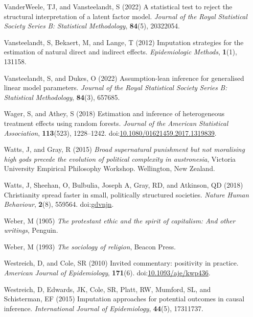 \documentclass[
  singlecolumn,
  9pt]{article}
\begin{document}
\begin{CSLReferences}
VanderWeele, TJ, and Vansteelandt, S (2022) A statistical test to reject
the structural interpretation of a latent factor model. \emph{Journal of
the Royal Statistical Society Series B: Statistical Methodology},
\textbf{84}(5), 20322054.

Vansteelandt, S, Bekaert, M, and Lange, T (2012) Imputation strategies
for the estimation of natural direct and indirect effects.
\emph{Epidemiologic Methods}, \textbf{1}(1), 131158.

Vansteelandt, S, and Dukes, O (2022) Assumption-lean inference for
generalised linear model parameters. \emph{Journal of the Royal
Statistical Society Series B: Statistical Methodology}, \textbf{84}(3),
657685.

Wager, S, and Athey, S (2018) Estimation and inference of heterogeneous
treatment effects using random forests. \emph{Journal of the American
Statistical Association}, \textbf{113}(523), 1228--1242.
doi:\href{https://doi.org/10.1080/01621459.2017.1319839}{10.1080/01621459.2017.1319839}.

Watts, J, and Gray, R (2015) \emph{Broad supernatural punishment but not
moralising high gods precede the evolution of political complexity in
austronesia}, Victoria University Empirical Philosophy Workshop.
Wellington, New Zealand.

Watts, J, Sheehan, O, Bulbulia, Joseph A, Gray, RD, and Atkinson, QD
(2018) Christianity spread faster in small, politically structured
societies. \emph{Nature Human Behaviour}, \textbf{2}(8), 559564.
doi:\href{https://doi.org/gdvnjn}{gdvnjn}.

Weber, M (1905) \emph{The protestant ethic and the spirit of capitalism:
And other writings}, Penguin.

Weber, M (1993) \emph{The sociology of religion}, Beacon Press.

Westreich, D, and Cole, SR (2010) Invited commentary: positivity in
practice. \emph{American Journal of Epidemiology}, \textbf{171}(6).
doi:\href{https://doi.org/10.1093/aje/kwp436}{10.1093/aje/kwp436}.

Westreich, D, Edwards, JK, Cole, SR, Platt, RW, Mumford, SL, and
Schisterman, EF (2015) Imputation approaches for potential outcomes in
causal inference. \emph{International Journal of Epidemiology},
\textbf{44}(5), 17311737.


\end{CSLReferences}
\end{document}
